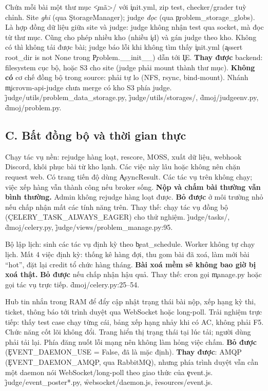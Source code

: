 {Chứa mỗi bài một thư mục \c{<mã>/} với \c{init.yml}, zip test, checker/grader tuỳ chỉnh. Site \emph{ghi} (qua \c{StorageManager}); judge \emph{đọc} (qua \c{problem_storage_globs}).}
{Là hợp đồng dữ liệu giữa site và judge: judge không nhận test qua socket, mà đọc từ thư mục. Cũng cho phép nhiều kho (nhiều \c{id}) và gán judge theo kho.}
{Không có thì không tải được bài; judge báo lỗi khi không tìm thấy \c{init.yml} (\c{assert root_dir is not None} trong \c{Problem.__init__}) dẫn tới \c{IE}.}
{\textbf{Thay được} backend: filesystem cục bộ, hoặc S3 cho site (judge phải mount thành thư mục). \textbf{Không có} cơ chế đồng bộ trong source: phải tự lo (NFS, rsync, bind-mount). Nhánh \c{microvm-api-judge} chưa merge có kho S3 phía judge.}
{\f{judge/utils/problem_data_storage.py}, \f{judge/utils/storages/}, \f{dmoj/judgeenv.py}, \f{dmoj/problem.py}.}

\subsection*{C. Bất đồng bộ và thời gian thực}
{Chạy tác vụ nền: rejudge hàng loạt, rescore, MOSS, xuất dữ liệu, webhook Discord, khôi phục bài từ kho lạnh.}
{Các việc này lâu hoặc không nên chặn request web. Có trang tiến độ dùng \c{AsyncResult}.}
{Các tác vụ trên không chạy; việc xếp hàng vẫn thành công nếu broker sống. \textbf{Nộp và chấm bài thường vẫn bình thường.} Admin không rejudge hàng loạt được.}
{\textbf{Bỏ được} ở môi trường nhỏ nếu chấp nhận mất các tính năng trên. Thay thế: chạy tác vụ đồng bộ (\c{CELERY_TASK_ALWAYS_EAGER}) cho thử nghiệm.}
{\f{judge/tasks/}, \f{dmoj/celery.py}, \f{judge/views/problem_manage.py:95}.}

{Bộ lập lịch: sinh các tác vụ định kỳ theo \c{beat_schedule}.}
{Worker không tự chạy lịch.}
{Mất 4 việc định kỳ: thống kê hàng đợi, thu gom bài đã xoá, làm mới bài ``hot'', đặt lại credit tổ chức hàng tháng. \textbf{Bài xoá mềm sẽ không bao giờ bị xoá thật.}}
{\textbf{Bỏ được} nếu chấp nhận hậu quả. Thay thế: cron gọi \c{manage.py} hoặc gọi tác vụ trực tiếp.}
{\f{dmoj/celery.py:25--54}.}

{Hub tin nhắn trong RAM để đẩy cập nhật trạng thái bài nộp, xếp hạng kỳ thi, ticket, thông báo tới trình duyệt qua WebSocket hoặc long-poll.}
{Trải nghiệm trực tiếp: thấy test case chạy từng cái, bảng xếp hạng nhảy khi có AC, không phải F5.}
{Chức năng cốt lõi không đổi. Trang hiển thị trạng thái tại lúc tải; người dùng phải tải lại. Phía đăng nuốt lỗi mạng nên không làm hỏng việc chấm.}
{\textbf{Bỏ được} (\c{EVENT_DAEMON_USE = False}, đã là mặc định). \textbf{Thay được}: AMQP (\c{EVENT_DAEMON_AMQP}, qua RabbitMQ), nhưng phía trình duyệt vẫn cần một daemon nói WebSocket/long-poll theo giao thức của \c{event.js}.}
{\f{judge/event_poster*.py}, \f{websocket/daemon.js}, \f{resources/event.js}.}


